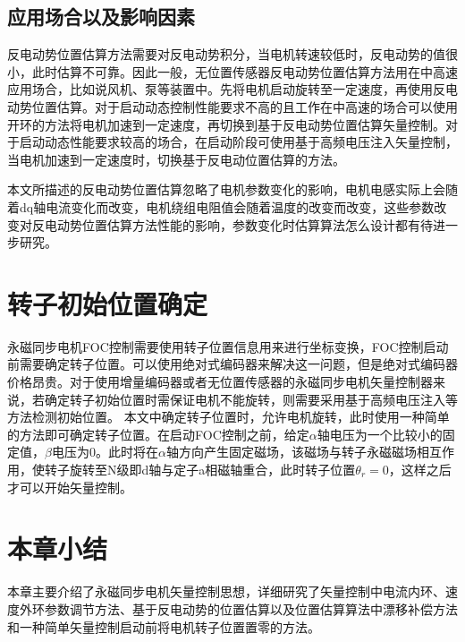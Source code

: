 \subsection{应用场合以及影响因素}
反电动势位置估算方法需要对反电动势积分，当电机转速较低时，反电动势的值很小，此时估算不可靠。因此一般，无位置传感器反电动势位置估算方法用在中高速应用场合，比如说风机、泵等装置中。先将电机启动旋转至一定速度，再使用反电动势位置估算。对于启动动态控制性能要求不高的且工作在中高速的场合可以使用开环的方法将电机加速到一定速度，再切换到基于反电动势位置估算矢量控制。对于启动动态性能要求较高的场合，在启动阶段可使用基于高频电压注入矢量控制，当电机加速到一定速度时，切换基于反电动位置估算的方法。

本文所描述的反电动势位置估算忽略了电机参数变化的影响，电机电感实际上会随着dq轴电流变化而改变，电机绕组电阻值会随着温度的改变而改变，这些参数改变对反电动势位置估算方法性能的影响，参数变化时估算算法怎么设计都有待进一步研究。
\section{转子初始位置确定}
永磁同步电机FOC控制需要使用转子位置信息用来进行坐标变换，FOC控制启动前需要确定转子位置。可以使用绝对式编码器来解决这一问题，但是绝对式编码器价格昂贵。对于使用增量编码器或者无位置传感器的永磁同步电机矢量控制器来说，若确定转子初始位置时需保证电机不能旋转，则需要采用基于高频电压注入等方法检测初始位置。
本文中确定转子位置时，允许电机旋转，此时使用一种简单的方法即可确定转子位置。在启动FOC控制之前，给定$\alpha$轴电压为一个比较小的固定值，$\beta$电压为0。此时将在$\alpha$轴方向产生固定磁场，该磁场与转子永磁磁场相互作用，使转子旋转至N级即d轴与定子a相磁轴重合，此时转子位置$\theta_{r}=0$，这样之后才可以开始矢量控制。
\section{本章小结}
本章主要介绍了永磁同步电机矢量控制思想，详细研究了矢量控制中电流内环、速度外环参数调节方法、基于反电动势的位置估算以及位置估算算法中漂移补偿方法和一种简单矢量控制启动前将电机转子位置置零的方法。